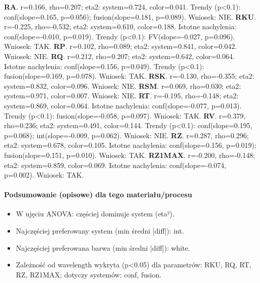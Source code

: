 \documentclass[
  10pt,
]{article}
\begin{document}
\textbf{RA}. r=0.166, rho=0.207; eta2: system=0.724, color=0.041. Trendy
(p\textless0.1): conf(slope=0.165, p=0.056); fusion(slope=0.181,
p=0.089). Wniosek: NIE. \textbf{RKU}. r=-0.225, rho=-0.532; eta2:
system=0.610, color=0.188. Istotne nachylenia: conf(slope=-0.010,
p=0.019). Trendy (p\textless0.1): FV(slope=-0.027, p=0.096). Wniosek:
TAK. \textbf{RP}. r=0.102, rho=0.089; eta2: system=0.841, color=0.042.
Wniosek: NIE. \textbf{RQ}. r=0.212, rho=0.207; eta2: system=0.642,
color=0.064. Istotne nachylenia: conf(slope=0.156, p=0.049). Trendy
(p\textless0.1): fusion(slope=0.169, p=0.078). Wniosek: TAK.
\textbf{RSK}. r=-0.130, rho=-0.355; eta2: system=0.832, color=0.096.
Wniosek: NIE. \textbf{RSM}. r=0.069, rho=0.030; eta2: system=0.971,
color=0.007. Wniosek: NIE. \textbf{RT}. r=-0.195, rho=-0.148; eta2:
system=0.869, color=0.064. Istotne nachylenia: conf(slope=-0.077,
p=0.013). Trendy (p\textless0.1): fusion(slope=-0.058, p=0.097).
Wniosek: TAK. \textbf{RV}. r=0.379, rho=0.236; eta2: system=0.491,
color=0.144. Trendy (p\textless0.1): conf(slope=0.195, p=0.068);
int(slope=-0.009, p=0.062). Wniosek: NIE. \textbf{RZ}. r=0.287,
rho=0.296; eta2: system=0.678, color=0.105. Istotne nachylenia:
conf(slope=0.156, p=0.019); fusion(slope=0.151, p=0.010). Wniosek: TAK.
\textbf{RZ1MAX}. r=-0.200, rho=-0.148; eta2: system=0.859, color=0.069.
Istotne nachylenia: conf(slope=-0.074, p=0.002). Wniosek: TAK.

\paragraph{Podsumowanie (opisowe) dla tego materiału/procesu}
\begin{itemize}
\item W ujęciu ANOVA: częściej dominuje system (eta²).
\item Najczęściej preferowany system (min średni |diff|): int.
\item Najczęściej preferowana barwa (min średni |diff|): white.
\item Zależność od wavelength wykryta (p<0.05) dla parametrów: RKU, RQ, RT, RZ, RZ1MAX; dotyczy systemów: conf, fusion.
\end{itemize}
\end{document}
